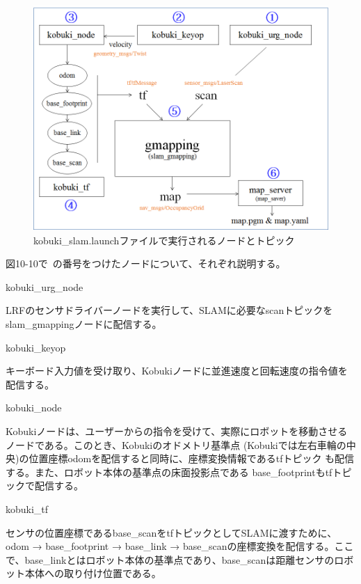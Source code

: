 \begin{figure}[htp]
  \centering
  \includegraphics[width=\columnwidth]{pictures/chapter10/pic_10_10.png}
  \caption{kobuki\_slam.launchファイルで実行されるノードとトピック}
\end{figure}

図10-10で~の番号をつけたノードについて、それぞれ説明する。

\setcounter{num}{0}

\circled{\thenum} kobuki\_urg\_node

LRFのセンサドライバーノードを実行して、SLAMに必要なscanトピックをslam\_gmappingノードに配信する。

\circled{\thenum} kobuki\_keyop

キーボード入力値を受け取り、Kobukiノードに並進速度と回転速度の指令値を配信する。

\circled{\thenum} kobuki\_node

Kobukiノードは、ユーザーからの指令を受けて、実際にロボットを移動させるノードである。このとき、Kobukiのオドメトリ基準点 (Kobukiでは左右車輪の中央)の位置座標odomを配信すると同時に、座標変換情報であるtfトピック  も配信する。また、ロボット本体の基準点の床面投影点である  base\_footprintもtfトピックで配信する。

\circled{\thenum} kobuki\_tf

センサの位置座標であるbase\_scanをtfトピックとしてSLAMに渡すために、odom → base\_footprint → base\_link → base\_scanの座標変換を配信する。ここで、base\_linkとはロボット本体の基準点であり、base\_scanは距離センサのロボット本体への取り付け位置である。

